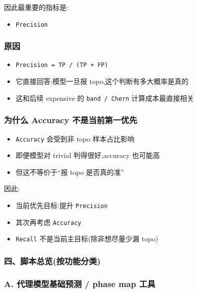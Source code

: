 \documentclass[lang=cn,scheme=chinese,color=blue,device=normal,toc=onecol,math=cm]{elegantbook}
\begin{document}
因此最重要的指标是:\par


\begin{itemize}
\item \texttt{Precision}
\end{itemize}


\subsubsection{原因}


\begin{itemize}
\item \texttt{Precision = TP /\allowbreak{} (TP + FP)}
\item 它直接回答:模型一旦报 topo,这个判断有多大概率是真的
\item 这和后续 expensive 的 \texttt{band /\allowbreak{} Chern} 计算成本最直接相关
\end{itemize}


\subsubsection{为什么 Accuracy 不是当前第一优先}


\begin{itemize}
\item \texttt{Accuracy} 会受到非 topo 样本占比影响
\item 即便模型对 trivial 判得很好,accuracy 也可能高
\item 但这不等价于“报 topo 是否真的准”
\end{itemize}


因此:\par


\begin{itemize}
\item 当前优先目标:提升 \texttt{Precision}
\item 其次再考虑 \texttt{Accuracy}
\item \texttt{Recall} 不是当前主目标(除非想尽量少漏 topo)
\end{itemize}


\subsubsection{四、脚本总览(按功能分类)}


\subsubsection{A. 代理模型基础预测 /\allowbreak{} phase map 工具}
\end{document}
